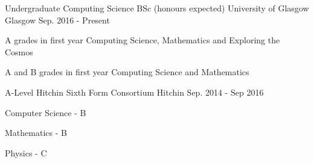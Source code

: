 

\begin{cventries}

  \cventry
    {Undergraduate Computing Science BSc (honours expected)} %
    {University of Glasgow} %
    {Glasgow} %
    {Sep. 2016 - Present} %
    {
      \begin{cvitems} %
        \item {A grades in first year Computing Science, Mathematics and Exploring the Cosmos}
        \item {A and B grades in first year Computing Science and Mathematics}
      \end{cvitems}
    }
  \cventry
    {A-Level}
    {Hitchin Sixth Form Consortium}
    {Hitchin}
    {Sep. 2014 - Sep 2016}
    {
      \begin{cvitems}
        \item{Computer Science - B}
	\item{Mathematics - B}
	\item{Physics - C}
      \end{cvitems}
    }
\end{cventries}
